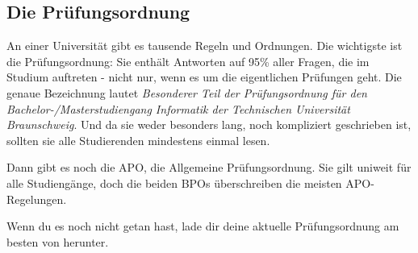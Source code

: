 
\subsection{Die Prüfungsordnung}
\label{po}
	An einer Universität gibt es tausende Regeln und Ordnungen. Die wichtigste ist die Prüfungsordnung: Sie enthält Antworten auf 95\% aller Fragen, die im Studium auftreten - nicht nur, wenn es um die eigentlichen Prüfungen geht. Die genaue Bezeichnung lautet \emph{Besonderer Teil der Prüfungsordnung für den Bachelor-/Masterstudiengang Informatik der Technischen Universität Braunschweig}. Und da sie weder besonders lang, noch kompliziert geschrieben ist, sollten sie alle Studierenden mindestens einmal lesen.

	Dann gibt es noch die APO, die Allgemeine Prüfungsordnung. Sie gilt uniweit für alle Studiengänge, doch die beiden BPOs überschreiben die meisten APO-Regelungen.

	Wenn du es noch nicht getan hast, lade dir deine aktuelle Prüfungsordnung am besten von  herunter.


